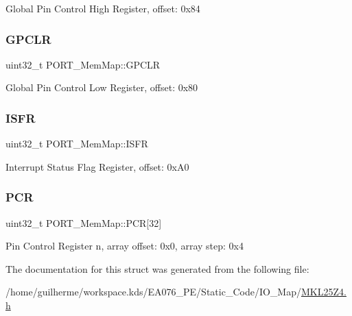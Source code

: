 Global Pin Control High Register, offset\+: 0x84 \mbox{\label{struct_p_o_r_t___mem_map_a837c289643f8cec958b1f01c086b558a}} 
\subsubsection{\texorpdfstring{G\+P\+C\+LR}{GPCLR}}
{\footnotesize\ttfamily uint32\+\_\+t P\+O\+R\+T\+\_\+\+Mem\+Map\+::\+G\+P\+C\+LR}

Global Pin Control Low Register, offset\+: 0x80 \mbox{\label{struct_p_o_r_t___mem_map_a53c86a08f430dc915a312efe74ba83e6}} 
\subsubsection{\texorpdfstring{I\+S\+FR}{ISFR}}
{\footnotesize\ttfamily uint32\+\_\+t P\+O\+R\+T\+\_\+\+Mem\+Map\+::\+I\+S\+FR}

Interrupt Status Flag Register, offset\+: 0x\+A0 \mbox{\label{struct_p_o_r_t___mem_map_a1c54a8f1741fade8daf28198fee43ddd}} 
\subsubsection{\texorpdfstring{P\+CR}{PCR}}
{\footnotesize\ttfamily uint32\+\_\+t P\+O\+R\+T\+\_\+\+Mem\+Map\+::\+P\+CR\mbox{[}32\mbox{]}}

Pin Control Register n, array offset\+: 0x0, array step\+: 0x4 

The documentation for this struct was generated from the following file\+:\begin{DoxyCompactItemize}
\item 
/home/guilherme/workspace.\+kds/\+E\+A076\+\_\+\+P\+E/\+Static\+\_\+\+Code/\+I\+O\+\_\+\+Map/\hyperlink{_m_k_l25_z4_8h}{M\+K\+L25\+Z4.\+h}\end{DoxyCompactItemize}
